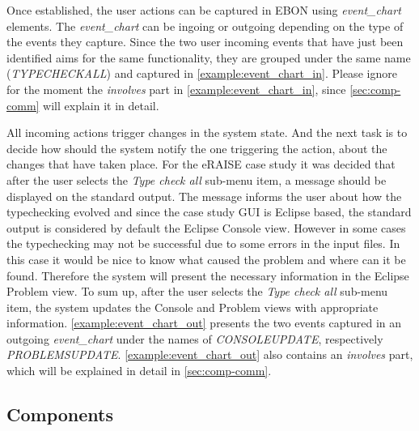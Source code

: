 \documentclass[conference]{IEEEtran}
\begin{document}


Once established, the user actions can be captured in EBON using
\emph{event\_chart} elements. The \emph{event\_chart} can be ingoing
or outgoing depending on the type of the events they capture. Since
the two user incoming events that have just been identified aims for
the same functionality, they are grouped under the same name
(\emph{TYPECHECKALL}) and captured in
\autoref{example:event_chart_in}. Please ignore for the moment the
\emph{involves} part in \autoref{example:event_chart_in}, since
\autoref{sec:comp-comm} will explain it in detail.




All incoming actions trigger changes in the system state. And the next
task is to decide how should the system notify the one triggering the
action, about the changes that have taken place. For the eRAISE case
study it was decided that after the user selects the \emph{Type check
all} sub-menu item, a message should be displayed on the standard
output. The message informs the user about how the typechecking
evolved and since the case study GUI is Eclipse based, the standard
output is considered by default the Eclipse Console view. However in
some cases the typechecking may not be successful due to some errors
in the input files. In this case it would be nice to know what caused
the problem and where can it be found. Therefore the system will
present the necessary information in the Eclipse Problem view. To sum
up, after the user selects the \emph{Type check all} sub-menu item,
the system updates the Console and Problem views with appropriate
information. \autoref{example:event_chart_out} presents the two events
captured in an outgoing \emph{event\_chart} under the names of
\emph{CONSOLEUPDATE}, respectively \emph{PROBLEMSUPDATE}.
\autoref{example:event_chart_out} also contains an \emph{involves}
part, which will be explained in detail in \autoref{sec:comp-comm}.


%
\subsection{Components}
\label{sec:components}
\end{document}
